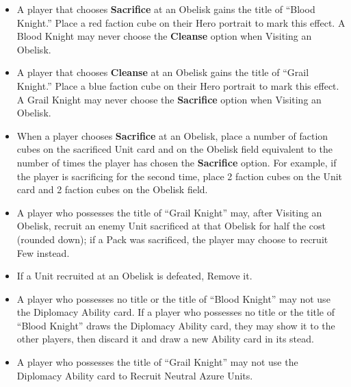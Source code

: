 \begin{multicols*}{2}
\begin{itemize}
\begin{enumerate}[leftmargin=15pt]
\begin{enumerate}
            \item *: Gain 18 , 9 , and 3 . Additionally, \textbf{Search (2)} the Relic card deck. Finally, if the Unit card was on the Pack side, \textbf{Search (2)} the  Unit deck; you may Recruit one of these Units for half the cost (rounded down).
        \end{enumerate}
    \end{enumerate}
    \item A player that chooses \textbf{Sacrifice} at an Obelisk gains the title of ``\textcolor{darkcandyapplered}{Blood Knight}.'' Place a red faction cube on their Hero portrait to mark this effect. A \textcolor{darkcandyapplered}{Blood Knight} may never choose the \textbf{Cleanse} option when Visiting an Obelisk.
    \item A player that chooses \textbf{Cleanse} at an Obelisk gains the title of ``\textcolor{darkcerulean}{Grail Knight}.'' Place a blue faction cube on their Hero portrait to mark this effect. A \textcolor{darkcerulean}{Grail Knight} may never choose the \textbf{Sacrifice} option when Visiting an Obelisk.
    \item When a player chooses \textbf{Sacrifice} at an Obelisk, place a number of faction cubes on the sacrificed Unit card and on the Obelisk field equivalent to the number of times the player has chosen the \textbf{Sacrifice} option. For example, if the player is sacrificing for the second time, place 2 faction cubes on the Unit card and 2 faction cubes on the Obelisk field.
    \item A player who possesses the title of ``\textcolor{darkcerulean}{Grail Knight}'' may, after Visiting an Obelisk, recruit an enemy Unit sacrificed at that Obelisk for half the cost (rounded down); if a Pack was sacrificed, the player may choose to recruit Few instead.
    \item If a Unit recruited at an Obelisk is defeated, Remove it.
    \item A player who possesses no title or the title of ``\textcolor{darkcandyapplered}{Blood Knight}'' may not use the Diplomacy Ability card. If a player who possesses no title or the title of ``\textcolor{darkcandyapplered}{Blood Knight}'' draws the Diplomacy Ability card, they may show it to the other players, then discard it and draw a new Ability card in its stead.
    \item A player who possesses the title of ``\textcolor{darkcerulean}{Grail Knight}'' may not use the Diplomacy Ability card to Recruit Neutral Azure Units.

\end{itemize}
\end{multicols*}
